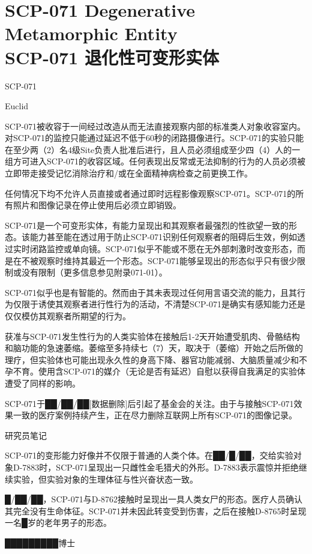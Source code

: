 \chapter[SCP-071 退化性可变形实体]{
    SCP-071 Degenerative Metamorphic Entity\\
    SCP-071 退化性可变形实体
}

\label{chap:SCP-071}

SCP-071

Euclid

SCP-071被收容于一间经过改造从而无法直接观察内部的标准类人对象收容室内。对SCP-071的监控只能通过延迟不低于60秒的闭路摄像进行。SCP-071的实验只能在至少两（2）名4级Site负责人批准后进行，且人员必须组成至少四（4）人的一组方可进入SCP-071的收容区域。任何表现出反常或无法抑制的行为的人员必须被立即带走接受记忆消除治疗和\slash 或在全面精神病检查之前更换工作。

任何情况下均不允许人员直接或者通过即时远程影像观察SCP-071。SCP-071的所有照片和图像记录在停止使用后必须立即销毁。

SCP-071是一个可变形实体，有能力呈现出和其观察者最强烈的性欲望一致的形态。该能力甚至能在透过用于防止SCP-071识别任何观察者的阻碍后生效，例如透过实时闭路监控或单向镜。SCP-071似乎不能或不愿在无外部刺激时改变形态，而是在不被观察时维持其最近一个形态。SCP-071能够呈现出的形态似乎只有很少限制或没有限制（更多信息参见附录071-01）。

SCP-071似乎也是有智能的。然而由于其未表现过任何用言语交流的能力，且其行为仅限于诱使其观察者进行性行为的活动，不清楚SCP-071是确实有感知能力还是仅仅模仿其观察者所期望的行为。

获准与SCP-071发生性行为的人类实验体在接触后1-2天开始遭受肌肉、骨骼结构和脑功能的急速萎缩。萎缩至多持续七（7）天，取决于（萎缩）开始之后所做的理疗，但实验体也可能出现永久性的身高下降、器官功能减弱、大脑质量减少和不孕不育。使用含SCP-071的媒介（无论是否有延迟）自慰以获得自我满足的实验体遭受了同样的影响。

SCP-071于██\slash ██\slash ██{[}数据删除]后引起了基金会的关注。由于与接触SCP-071效果一致的医疗案例持续产生，正在尽力删除互联网上所有SCP-071的图像记录。

研究员笔记

\begin{scpbox}

SCP-071的变形能力好像并不仅限于普通的人类个体。在██\slash █\slash ██，交给实验对象D-7883时，SCP-071呈现出一只雌性金毛猎犬的外形。D-7883表示震惊并拒绝继续实验，但实验对象的生理体征与性兴奋状态一致。

█\slash ██\slash ██，SCP-071与D-8762接触时呈现出一具人类女尸的形态。医疗人员确认其完全没有生命体征。SCP-071并未因此转变受到伤害，之后在接触D-8765时呈现一名█岁的老年男子的形态。

█████████博士

\end{scpbox}

